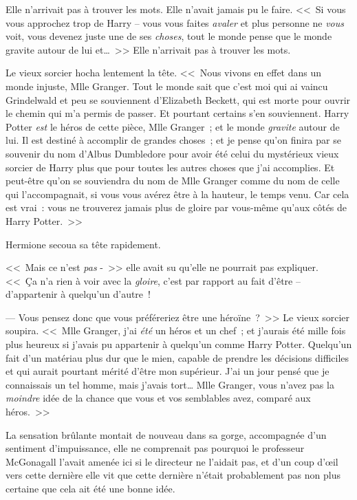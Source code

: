 Elle n'arrivait pas à trouver les mots. Elle n'avait jamais pu le faire. <<~Si vous vous approchez trop de Harry -- vous vous faites \emph{avaler} et plus personne ne \emph{vous} voit, vous devenez juste une de ses \emph{choses}, tout le monde pense que le monde gravite autour de lui et…~>> Elle n'arrivait pas à trouver les mots.

Le vieux sorcier hocha lentement la tête. <<~Nous vivons en effet dans un monde injuste, Mlle Granger. Tout le monde sait que c'est moi qui ai vaincu Grindelwald et peu se souviennent d'Elizabeth Beckett, qui est morte pour ouvrir le chemin qui m'a permis de passer. Et pourtant certains s'en souviennent. Harry Potter \emph{est} le héros de cette pièce, Mlle Granger~; et le monde \emph{gravite} autour de lui. Il est destiné à accomplir de grandes choses~; et je pense qu'on finira par se souvenir du nom d'Albus Dumbledore pour avoir été celui du mystérieux vieux sorcier de Harry plus que pour toutes les autres choses que j'ai accomplies. Et peut-être qu'on se souviendra du nom de Mlle Granger comme du nom de celle qui l'accompagnait, si vous vous avérez être à la hauteur, le temps venu. Car cela est vrai~: vous ne trouverez jamais plus de gloire par vous-même qu'aux côtés de Harry Potter.~>>

Hermione secoua sa tête rapidement.

<<~Mais ce n'est \emph{pas} -~>> elle avait su qu'elle ne pourrait pas expliquer. <<~Ça n'a rien à voir avec la \emph{gloire}, c'est par rapport au fait d'être -- d'appartenir à quelqu'un d'autre~!

--- Vous pensez donc que vous préféreriez être une héroïne~?~>> Le vieux sorcier soupira. <<~Mlle Granger, j'ai \emph{été} un héros et un chef~; et j'aurais été mille fois plus heureux si j'avais pu appartenir à quelqu'un comme Harry Potter. Quelqu'un fait d'un matériau plus dur que le mien, capable de prendre les décisions difficiles et qui aurait pourtant mérité d'être mon supérieur. J'ai un jour pensé que je connaissais un tel homme, mais j'avais tort… Mlle Granger, vous n'avez pas la \emph{moindre} idée de la chance que vous et vos semblables avez, comparé aux héros.~>>

La sensation brûlante montait de nouveau dans sa gorge, accompagnée d'un sentiment d'impuissance, elle ne comprenait pas pourquoi le professeur McGonagall l'avait amenée ici si le directeur ne l'aidait pas, et d'un coup d'œil vers cette dernière elle vit que cette dernière n'était probablement pas non plus certaine que cela ait été une bonne idée.

